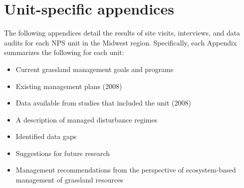 \section*{Unit-specific appendices}

\begin{adjustwidth}{2cm}{2cm}



The following appendices detail the results of site visits, interviews, and data audits for each NPS unit in the Midwest region. Specifically, each Appendix summarizes the following for each unit: 

\begin{itemize}
	\item Current grassland management goals and programs
	\item Existing management plans (2008)
	\item Data available from studies that included the unit (2008)
	\item A description of managed disturbance regimes 
	\item Identified data gaps 
	\item Suggestions for future research 
	\item Management recommendations from the perspective of ecosystem-based management of grassland resources
\end{itemize}

\end{adjustwidth}